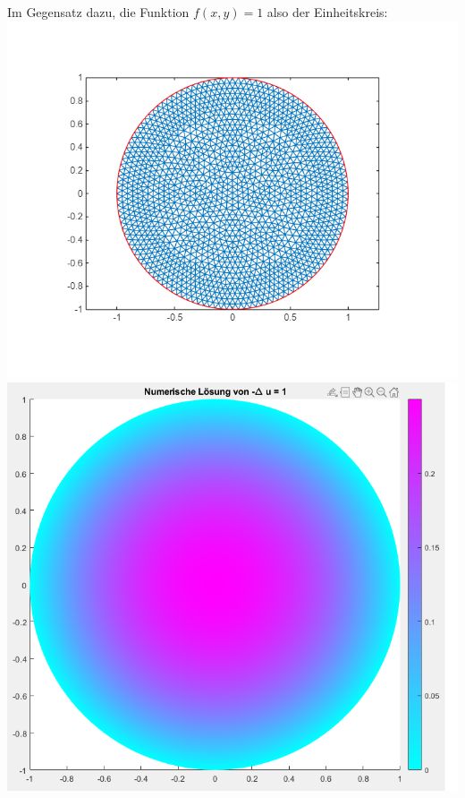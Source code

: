 \documentclass{scrartcl}
\begin{document}
Im Gegensatz dazu, die Funktion $f(x,y) = 1$ also der Einheitskreis:\\
\includegraphics[scale=0.5]{Poisson1aplot2mesh.png}
\includegraphics[scale=0.4]{Poisson1aplot2.png}\\
\end{document}
